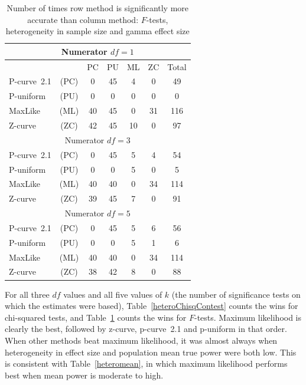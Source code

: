 \documentclass[jou]{apa6} %
\begin{document}
\begin{table} %
\caption{Number of times row method is significantly more accurate than column method: $F$-tests, heterogeneity in sample size and gamma effect size}
{\small
\begin{center}
\begin{tabular}{l c ccccc }  \hline
\multicolumn{7}{c}{Numerator $df=1$} \\ \hline
& &       PC & PU & ML & ZC & Total  \\
P-curve~2.1   & (PC)   &  0       & 45      & 4     &  0  &  49  \\
P-uniform & (PU)   &  0       &  0      & 0     &  0  &   0  \\
MaxLike   & (ML)   & 40       & 45      & 0     & 31  & 116  \\
Z-curve   & (ZC)   & 42       & 45      & 10    &  0  &  97  \\ \hline
\multicolumn{7}{c}{Numerator $df=3$} \\ \hline
P-curve~2.1   & (PC)   &  0       & 45      &  5    &  4  &  54  \\
P-uniform & (PU)   &  0       &  0      &  5    &  0  &   5  \\
MaxLike   & (ML)   & 40       & 40      &  0    & 34  & 114  \\
Z-curve   & (ZC)   & 39       & 45      &  7    &  0  &  91  \\ \hline
\multicolumn{7}{c}{Numerator $df=5$} \\ \hline
P-curve~2.1   & (PC)  &   0       & 45      &  5    &  6  &  56  \\
P-uniform & (PU)  &   0       &  0      &  5    &  1  &   6  \\
MaxLike   & (ML)  &   40      & 40      &  0    & 34  & 114  \\
Z-curve   & (ZC)  &   38      & 42      &  8    &  0  &  88  \\ \hline
\end{tabular}
\end{center}
} %
\label{heteroFtestContest}  %
\end{table}

For all three $df$ values and all five values of $k$ (the number of significance tests on which the estimates were based), Table~\ref{heteroChisqContest} counts the wins for chi-squared tests, and Table~\ref{heteroFtestContest} counts the wins for $F$-tests. Maximum likelihood is clearly the best, followed by z-curve, p-curve~2.1 and p-uniform in that order. When other methods beat maximum likelihood, it was almost always when heterogeneity in effect size and population mean true power were both low. This is consistent with Table~\ref{heteromean}, in which maximum likelihood performs best when mean power is moderate to high. 
\end{document}
